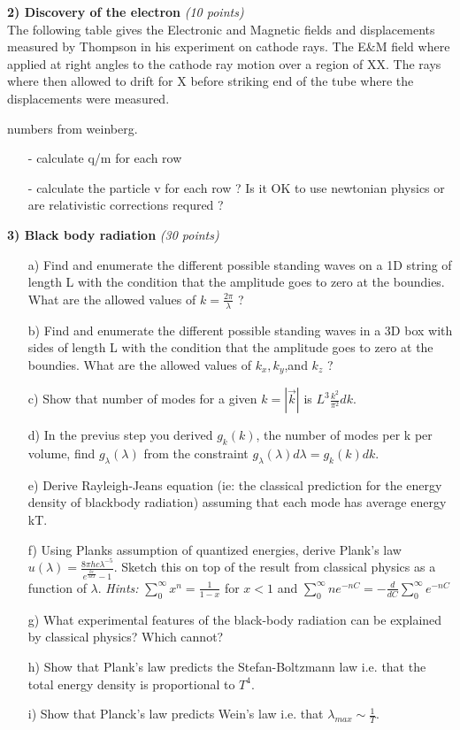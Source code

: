 {\large

\textbf{2) Discovery of the electron } \hfill  \textit{(10 points)}\\
The following table gives the Electronic and Magnetic fields and displacements measured by Thompson in his experiment on cathode rays.
The E\&M field where applied at right angles to the cathode ray motion over a region of XX.
The rays where then allowed to drift for X before striking end of the tube where the displacements were measured.

numbers from weinberg.

\begin{itemize}
\item[-]calculate q/m for each row
\item[-]calculate the particle v for each row ? Is it OK to use newtonian physics or are relativistic corrections requred ?
\end{itemize}

\textbf{3) Black body radiation } \hfill \textit{(30 points)}
\begin{itemize}
\item[a)] Find and enumerate the different possible standing waves on a 1D string of length L with the condition that the amplitude goes to zero at the boundies.
         What are the allowed values of $k=\frac{2\pi}{\lambda}$ ?
\item[b)] Find and enumerate the different possible standing waves in a 3D box with sides of length L with the condition that the amplitude goes to zero at the boundies.
         What are the allowed values of $k_x,k_y$,and $k_z$ ?
\item[c)] Show that number of modes for a given $k = |\vec{k}|$ is $L^3 \frac{k^2}{\pi^2} dk$.
\item[d)] In the previus step you derived $g_k(k)$, the number of modes per k per volume, find $g_\lambda(\lambda)$ from the constraint $g_\lambda(\lambda)d\lambda = g_k(k)dk$.
\item[e)] Derive Rayleigh-Jeans equation (ie: the classical prediction for the energy density of blackbody radiation) assuming that each mode has average energy kT.
\item[f)] Using Planks assumption of quantized energies, derive Plank's law $u(\lambda) = \frac{8\pi h c \lambda^{-5}}{e^{\frac{hc}{\lambda kT}} - 1}$.
Sketch this on top of the result from classical physics as a function of $\lambda$.
\textit{Hints:} $\sum_0^\infty x^n = \frac{1}{1-x}$ for $x<1$ and $\sum_0^\infty n e^{-nC} = - \frac{d}{dC} \sum_0^\infty e^{-nC}$
\item[g)] What experimental features of the black-body radiation can be explained by classical physics? Which cannot?
\item[h)] Show that Plank's law predicts the Stefan-Boltzmann law i.e. that the total energy density is proportional to $T^4$.
\item[i)] Show that Planck’s law predicts Wein’s law i.e. that $\lambda_{max} \sim \frac{1}{T}$.
\end{itemize}

}
